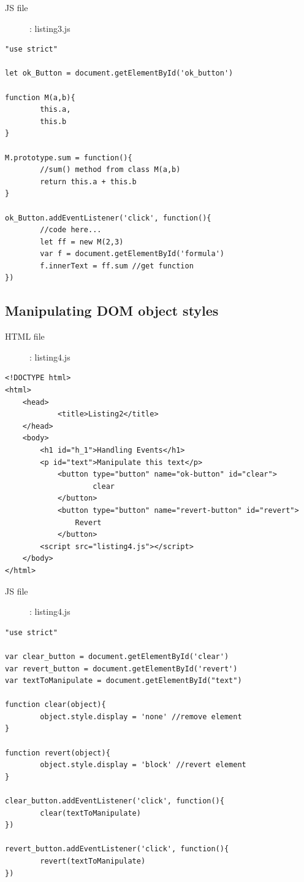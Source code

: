 \documentclass[10pt, a4paper, twocolumn]{article}
\begin{document}
\begin{description}
	\item[JS file] : listing3.js
\end{description}

\begin{lstlisting}
"use strict"

let ok_Button = document.getElementById('ok_button')

function M(a,b){
		this.a,
		this.b
}

M.prototype.sum = function(){
		//sum() method from class M(a,b)
		return this.a + this.b
}

ok_Button.addEventListener('click', function(){
		//code here...
		let ff = new M(2,3)
		var f = document.getElementById('formula')
		f.innerText = ff.sum //get function
})

\end{lstlisting}

\subsection{Manipulating DOM object styles}

\begin{description}
	\item[HTML file]: listing4.js
\end{description}

\begin{lstlisting}
<!DOCTYPE html>
<html>
	<head>
			<title>Listing2</title>
	</head>
	<body>
		<h1 id="h_1">Handling Events</h1>
		<p id="text">Manipulate this text</p>
			<button type="button" name="ok-button" id="clear">
					clear
			</button>
			<button type="button" name="revert-button" id="revert">
				Revert
			</button>
		<script src="listing4.js"></script>
	</body>
</html>
\end{lstlisting}

\begin{description}
	\item[JS file]: listing4.js
\end{description}

\begin{lstlisting}
"use strict"

var clear_button = document.getElementById('clear')
var revert_button = document.getElementById('revert')
var textToManipulate = document.getElementById("text")

function clear(object){
		object.style.display = 'none' //remove element
}

function revert(object){
		object.style.display = 'block' //revert element
}

clear_button.addEventListener('click', function(){
		clear(textToManipulate)
})

revert_button.addEventListener('click', function(){
		revert(textToManipulate)
})
\end{lstlisting}
\printbibliography[title={Bibliography}] %

\end{document}
